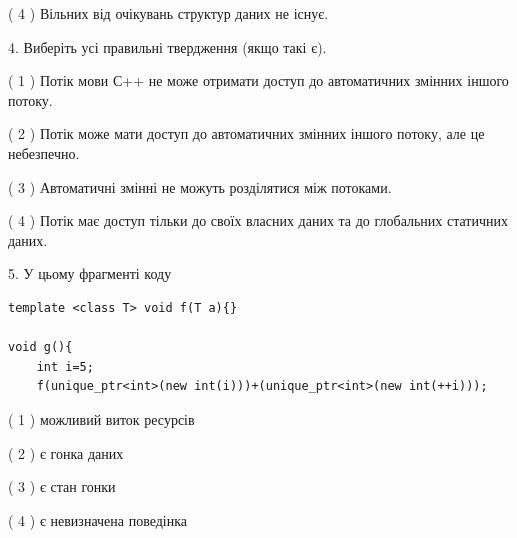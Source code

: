 \documentclass[12pt, ukrainian]{article}
\begin{document}
\begin {large}
{( 4 ) Вільних від очікувань структур даних не існує.%


4. Виберіть усі правильні твердження (якщо такі є).\par
\vspace{2mm}

( 1 ) Потік мови С++ не може отримати доступ до автоматичних змінних іншого потоку.%

( 2 ) Потік може мати доступ до автоматичних змінних іншого потоку, але це небезпечно.%

( 3 ) Автоматичні змінні не можуть розділятися між потоками.%

( 4 ) Потік має доступ тільки до своїх власних даних та до глобальних статичних даних.%


5. У цьому фрагменті коду
\begin{verbatim}
template <class T> void f(T a){}

void g(){
    int i=5;
    f(unique_ptr<int>(new int(i)))+(unique_ptr<int>(new int(++i)));
\end{verbatim}
( 1 ) можливий виток ресурсів%

( 2 ) є гонка даних%

( 3 ) є стан гонки%

( 4 ) є невизначена поведінка%
}
\end {large}
\end{document}

